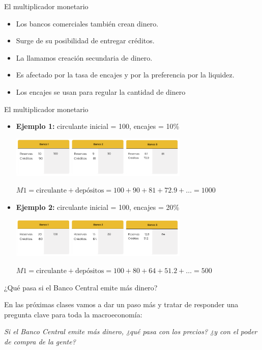 \documentclass{beamer}
\begin{document}
\begin{frame}{El multiplicador monetario}
    \begin{itemize}
        \item Los bancos comerciales también crean dinero.
        \item Surge de su posibilidad de entregar créditos.
        \item La llamamos creación secundaria de dinero.
        \item Es afectado por la tasa de encajes y por la preferencia por la liquidez.
        \item Los encajes se usan para regular la cantidad de dinero
    \end{itemize}
\end{frame}

\begin{frame}{El multiplicador monetario}
\begin{itemize}
    \item[\textbullet] \textbf{Ejemplo 1:} circulante inicial = 100, encajes = 10\%
    \begin{center}
        \scriptsize
        \includegraphics[width=8.5cm]{../Figures/C37.15.png}
        
        \vspace{0.3em}
        $M1 = \text{circulante} + \text{depósitos} = 100 + 90 + 81 + 72.9 + \dots = 1000$
    \end{center}

    \item[\textbullet] \textbf{Ejemplo 2:} circulante inicial = 100, encajes = 20\%
    \begin{center}
        \scriptsize
        \includegraphics[width=8.5cm]{../Figures/C37.16.png}
        
        \vspace{0.3em}
        $M1 = \text{circulante} + \text{depósitos} = 100 + 80 + 64 + 51.2 + \dots = 500$
    \end{center}
\end{itemize}
\end{frame}

\begin{frame}{¿Qué pasa si el Banco Central emite más dinero?}
    \begin{boxB}
        \centering
        En las próximas clases vamos a dar un paso más y tratar de responder una pregunta clave para toda la macroeconomía:

        \vspace{0.2em}
        \textit{Si el Banco Central emite más dinero, ¿qué pasa con los precios? ¿y con el poder de compra de la gente?}
    \end{boxB}
\end{frame}
\end{document}
